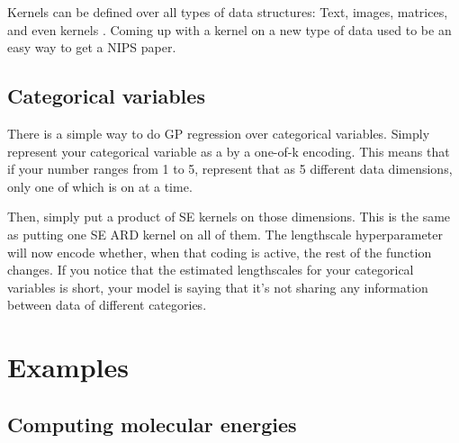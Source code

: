 Kernels can be defined over all types of data structures: Text, images, matrices, and even kernels . Coming up with a kernel on a new type of data used to be an easy way to get a NIPS paper.

\subsection{Categorical variables}

There is a simple way to do GP regression over categorical variables. Simply represent your categorical variable as a by a one-of-k encoding. This means that if your number ranges from 1 to 5, represent that as 5 different data dimensions, only one of which is on at a time. 

Then, simply put a product of SE kernels on those dimensions. This is the same as putting one SE ARD kernel on all of them. The lengthscale hyperparameter will now encode whether, when that coding is active, the rest of the function changes. If you notice that the estimated lengthscales for your categorical variables is short, your model is saying that it's not sharing any information between data of different categories. 



\section{Examples}

\subsection{Computing molecular energies}


